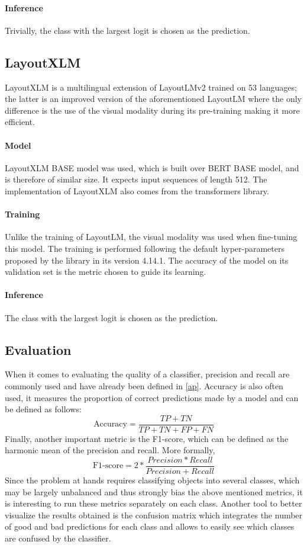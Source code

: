 \paragraph{Inference}
Trivially, the class with the largest logit is chosen as the prediction.

\subsection{LayoutXLM}
\label{layoutxlm}
LayoutXLM \citep{xu_layoutxlm_2021} is a multilingual extension of LayoutLMv2 \citep{xu_layoutlmv2_2021} trained on 53 languages; the latter is an improved version of the aforementioned LayoutLM where the only difference is the use of the visual modality during its pre-training making it more efficient. 

\paragraph{Model}
LayoutXLM BASE model was used, which is built over BERT BASE model, and is therefore of similar size. It expects input sequences of length 512. The implementation of LayoutXLM also comes from the transformers library.

\paragraph{Training}
Unlike the training of LayoutLM, the visual modality was used when fine-tuning this model. The training is performed following the default hyper-parameters proposed by the library in its version 4.14.1. The accuracy of the model on its validation set is the metric chosen to guide its learning.

\paragraph{Inference}
The class with the largest logit is chosen as the prediction.

\subsection{Evaluation}
\label{table_classification_evaluation}
When it comes to evaluating the quality of a classifier, precision and recall are commonly used and have already been defined in \ref{ap}. Accuracy is also often used, it measures the proportion of correct predictions made by a model and can be defined as follows:
\[ \text{Accuracy}=\frac{TP + TN}{TP + TN + FP + FN}\]
Finally, another important metric is the F1-score, which can be defined as the harmonic mean of the precision and recall. More formally,
\[ \text{F1-score}=2*\frac{Precision * Recall}{Precision + Recall}\]
Since the problem at hands requires classifying objects into several classes, which may be largely unbalanced and thus strongly bias the above mentioned metrics, it is interesting to run these metrics separately on each class. Another tool to better visualize the results obtained is the confusion matrix which integrates the number of good and bad predictions for each class and allows to easily see which classes are confused by the classifier.